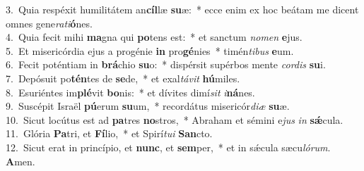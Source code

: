{3.~}Quia respéxit humilitátem an\textbf{cíl}læ \textbf{su}æ:~* ecce enim ex hoc beátam me dicent omnes gene\textit{ra}\textit{ti}\textbf{ó}nes.\\
{4.~}Quia fecit mihi \textbf{ma}gna qui \textbf{po}tens est:~* et sanctum \textit{no}\textit{men} \textbf{e}jus.\\
{5.~}Et misericórdia ejus a progénie \textbf{in} pro\textbf{gé}nies~* timén\textit{ti}\textit{bus} \textbf{e}um.\\
{6.~}Fecit poténtiam in \textbf{brá}chio \textbf{su}o:~* dispérsit supérbos mente \textit{cor}\textit{dis} \textbf{su}i.\\
{7.~}Depósuit po\textbf{tén}tes de \textbf{se}de,~* et exal\textit{tá}\textit{vit} \textbf{hú}miles.\\
{8.~}Esuriéntes im\textbf{plé}vit \textbf{bo}nis:~* et dívites dimí\textit{sit} \textit{i}\textbf{ná}nes.\\
{9.~}Suscépit Israël \textbf{pú}erum \textbf{su}um,~* recordátus misericór\textit{di}\textit{æ} \textbf{su}æ.\\
{10.~}Sicut locútus est ad \textbf{pa}tres \textbf{no}stros,~* Abraham et sémini e\textit{jus} \textit{in} \textbf{sǽ}cula.\\
{11.~}Glória \textbf{Pa}tri, et \textbf{Fí}lio,~* et Spirí\textit{tu}\textit{i} \textbf{San}cto.\\
{12.~}Sicut erat in princípio, et \textbf{nunc}, et \textbf{sem}per,~* et in sǽcula sæcu\textit{ló}\textit{rum}. \textbf{A}men.\\
